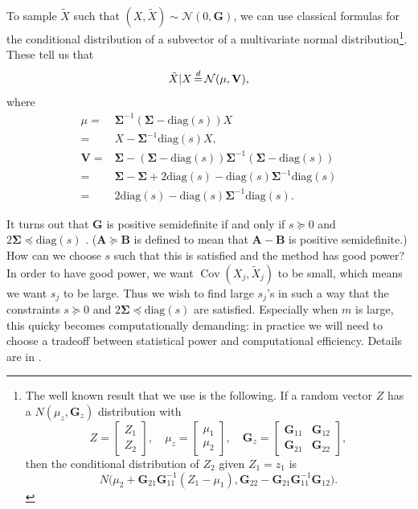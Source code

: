 \documentclass[11pt]{article}
\theoremstyle{plain}
\theoremstyle{definition}
\newcommand{\N}{\mathcal{N}}
\newcommand{\Sigm}{\mathbf{\Sigma}}
\newcommand{\citt}{\citet}
\newcommand{\citp}{\citep}
\DeclareMathOperator{\Cov}{Cov}
\begin{document}
  To sample $\tilde{X}$ such that $(X, \tilde{X})\sim \N(0,\mathbf{G})$, we can use classical formulas for the conditional distribution of a subvector of a multivariate normal distribution\footnote{
  The well known result that we use is the following. If a random vector $Z$ has a $N(\mu_z,\mathbf{G}_z)$ distribution with 
  $$
  Z=\begin{bmatrix}
{Z_1}\\
{Z_2} 
\end{bmatrix},\quad \mu_z=\begin{bmatrix}
{\mu_1}\\
{\mu_2} 
\end{bmatrix},\quad \mathbf{G}_z=
\begin{bmatrix}
\mathbf{G}_{11}& \mathbf{G}_{12} \\
\mathbf{G}_{21} &\mathbf{G}_{22}
\end{bmatrix}
,$$ 
then the conditional distribution of $Z_2$ given $Z_1=z_1$ is
$$ N\big(\mu_2+\mathbf{G}_{21}\mathbf{G}_{11}^{-1}(Z_1-\mu_1), \mathbf{G}_{22}- \mathbf{G}_{21}\mathbf{G}_{11}^{-1}\mathbf{G}_{12}\big).$$
}. 
These tell us that
  $$\tilde{X}|X \,{\buildrel d \over =}\, \N(\mu,\mathbf{V}),$$
  where 
  \begin{align*}
   \mu =& \Sigm^{-1}(\Sigm-\text{diag}(s)) X \\
         =& X-\Sigm^{-1}\text{diag}(s)X,\\
         \mathbf{V} =&  \Sigm -  (\Sigm-\text{diag}(s))\Sigm^{-1} (\Sigm-\text{diag}(s)) \\
         =&  \Sigm -  \Sigm +           2\text{diag}(s)   -\text{diag}(s)\Sigm^{-1}\text{diag}(s) \\
         =& 2\text{diag}(s) - \text{diag}(s)\Sigm^{-1}\text{diag}(s).
  \end{align*}
  
  It turns out that $\mathbf{G}$ is positive semidefinite if and only if $s\succeq 0$ and $2\Sigm\preceq \text{diag}(s)$ \citp[][pp. 2057, 2062]{barber2015controlling}. ($\mathbf{A} \succeq \mathbf{B}$ is defined to mean that $\mathbf{A} - \mathbf{B}$ is positive semidefinite.) 
  How can we choose $s$ such that this is satisfied and the method has good power? In order to have good power, we want $\Cov(X_j,\tilde{X}_j)$ to be small, which means we want $s_j$ to be large. Thus we wish to find large $s_j$'s in such a way that the constraints $s\succeq 0$ and $2\Sigm\preceq \text{diag}(s)$ are satisfied. Especially when $m$ is large, this quicky becomes computationally demanding: in practice we will need to choose a tradeoff between statistical power and computational efficiency. Details are in \citt[][pp.564-565]{candes2018panning}.
  
\end{document}
